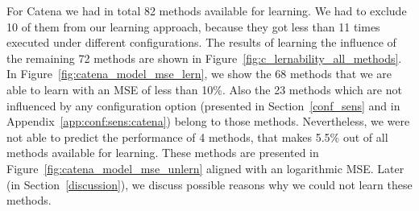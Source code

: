 For Catena we had in total 82 methods available for learning. We had to exclude 10 of them from our learning approach, because they got less than 11 times executed under different configurations. The results of learning the influence of the remaining 72 methods are shown in Figure~\ref{fig:c_lernability_all_methods}. In Figure~\ref{fig:catena_model_mse_lern}, we show the 68 methods that we are able to learn with an \ac{MSE} of less than 10\%. Also the 23 methods which are not influenced by any configuration option (presented in Section~\ref{conf_sens} and in Appendix~\ref{app:conf:sens:catena}) belong to those methods. Nevertheless, we were not able to predict the performance of 4 methods, that makes 5.5\% out of all methods available for learning. These methods are presented in Figure~\ref{fig:catena_model_mse_unlern} aligned with an logarithmic \ac{MSE}. Later (in Section~\ref{discussion}), we discuss possible reasons why we could not learn these methods.

